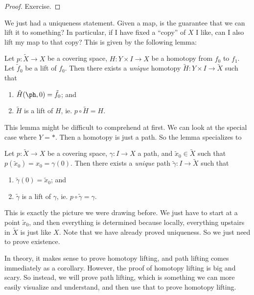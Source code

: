 \documentclass[a4paper]{article}
\begin{document}
\begin{proof}
  Exercise. %
\end{proof}

We just had a uniqueness statement. Given a map, is the guarantee that we can lift it to something? In particular, if I have fixed a ``copy'' of $X$ I like, can I also lift my map to that copy? This is given by the following lemma:

\begin{lemma}
  Let $p: \tilde{X} \to X$ be a covering space, $H: Y\times I \to X$ be a homotopy from $f_0$ to $f_1$. Let $\tilde{f}_0$ be a lift of $f_0$. Then there exists a \emph{unique} homotopy $\tilde{H}: Y\times I \to \tilde{X}$ such that
  \begin{enumerate}
    \item $\tilde{H}(\ph, 0) = \tilde{f}_0$; and
    \item $\tilde{H}$ is a lift of $H$, ie. $p\circ\tilde{H} = H$.
  \end{enumerate}
\end{lemma}
This lemma might be difficult to comprehend at first. We can look at the special case where $Y = *$. Then a homotopy is just a path. So the lemma specializes to
\begin{lemma}
  Let $p: \tilde{X} \to X$ be a covering space, $\gamma: I\to X$ a path, and $\tilde{x}_0 \in \tilde{X}$ such that $p(\tilde{x}_0) = x_0 = \gamma(0)$. Then there exists a \emph{unique} path $\tilde{\gamma}: I\to \tilde{X}$ such that
  \begin{enumerate}
    \item $\tilde{\gamma}(0) = \tilde{x}_0$; and
    \item $\tilde{\gamma}$ is a lift of $\gamma$, ie. $p\circ \tilde{\gamma} = \gamma$.
  \end{enumerate}
\end{lemma}
This is exactly the picture we were drawing before. We just have to start at a point $\tilde{x}_0$, and then everything is determined because locally, everything upstairs in $\tilde{X}$ is just like $X$. Note that we have already proved uniqueness. So we just need to prove existence.

In theory, it makes sense to prove homotopy lifting, and path lifting comes immediately as a corollary. However, the proof of homotopy lifting is big and scary. So instead, we will prove path lifting, which is something we can more easily visualize and understand, and then use that to prove homotopy lifting.
\end{document}
